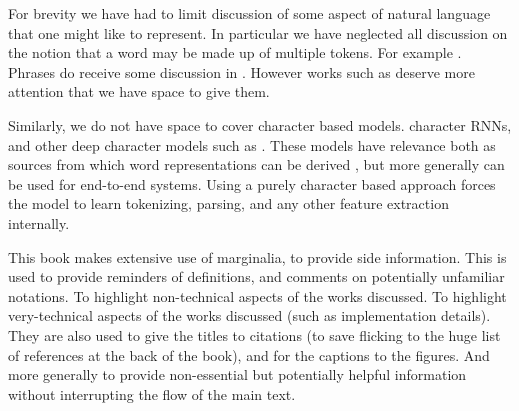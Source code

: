 \documentclass[12pt,parskip]{komatufte}
\begin{document}
For brevity we have had to limit discussion of some aspect of natural language that one might like to represent.
In particular we have neglected all discussion on the notion that a word may be made up of multiple tokens.
For example .
Phrases do receive some discussion in .
However works such as  deserve more attention that we have space to give them.

Similarly, we do not have space to cover character based models.
character RNNs, and other deep character models such as .
These models have relevance both as sources from which word representations can be derived ,
but more generally can be used for end-to-end systems.
Using a purely character based approach forces the model to learn tokenizing, parsing, and any other feature extraction internally.



This book makes extensive use of marginalia, to provide side information.
This is used to provide reminders of definitions, and comments on potentially unfamiliar notations.
To highlight non-technical aspects of the works discussed.
To highlight very-technical aspects of the works discussed (such as implementation details).
They are also used to give the titles to citations (to save flicking to the huge list of references at the back of the book), and for the captions to the figures.
And more generally to provide non-essential  but potentially helpful information without interrupting the flow of the main text.
\end{document}
